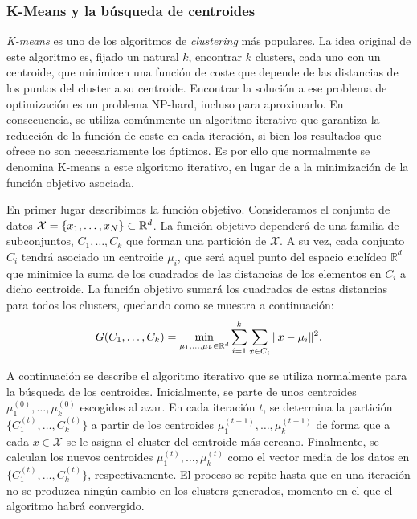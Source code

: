 \subsubsection{K-Means y la búsqueda de centroides}

\emph{K-means} es uno de los algoritmos de \emph{clustering} más populares. La idea original de este algoritmo es, fijado un natural $k$, encontrar $k$ clusters, cada uno con un centroide, que minimicen una función de coste que depende de las distancias de los puntos del cluster a su centroide. Encontrar la solución a ese problema de optimización es un problema NP-hard, incluso para aproximarlo. En consecuencia, se utiliza comúnmente un algoritmo iterativo que garantiza la reducción de la función de coste en cada iteración, si bien los resultados que ofrece no son necesariamente los óptimos. Es por ello que normalmente se denomina K-means a este algoritmo iterativo, en lugar de a la minimización de la función objetivo asociada.

En primer lugar describimos la función objetivo. Consideramos el conjunto de datos $\mathcal{X} = \{x_1,\dots,x_N\} \subset \mathbb{R}^d$. La función objetivo dependerá de una familia de subconjuntos, $C_1,\dots,C_k$ que forman una partición de $\mathcal{X}$. A su vez, cada conjunto $C_i$ tendrá asociado un centroide $\mu_i$, que será aquel punto del espacio euclídeo $\mathbb{R}^d$ que minimice la suma de los cuadrados de las distancias de los elementos en $C_i$ a dicho centroide.  La función objetivo sumará los cuadrados de estas distancias para todos los clusters, quedando como se muestra a continuación:
\begin{equation} \label{eq:obj:kmeans}
    G(C_1,\dots,C_k) = \min_{\mu_1,\dots,\mu_k \in \mathbb{R}^d} \sum_{i=1}^{k}\sum_{x\in C_i} \|x-\mu_i\|^2.
\end{equation}

A continuación se describe el algoritmo iterativo que se utiliza normalmente para la búsqueda de los centroides. Inicialmente, se parte de unos centroides $\mu_1^{(0)},\dots,\mu_k^{(0)}$ escogidos al azar. En cada iteración $t$, se determina la partición $\{C_1^{(t)},\dots,C_k^{(t)}\}$ a partir de los centroides $\mu_1^{(t-1)},\dots,\mu_k^{(t-1)}$ de forma que a cada $x \in \mathcal{X}$ se le asigna el cluster del centroide más cercano. Finalmente, se calculan los nuevos centroides $\mu_1^{(t)},\dots,\mu_k^{(t)}$ como el vector media de los datos en $\{C_1^{(t)},\dots,C_k^{(t)}\}$, respectivamente. El proceso se repite hasta que en una iteración no se produzca ningún cambio en los clusters generados, momento en el que el algoritmo habrá convergido.

